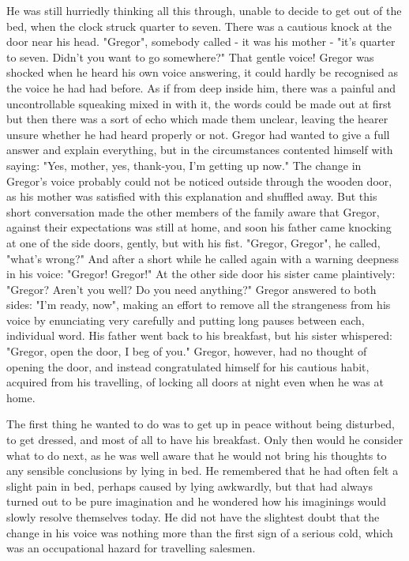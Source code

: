 \documentclass[12pt]{book}
\begin{document}
    He was still hurriedly thinking all this through, unable to decide to get out of the bed, when the clock struck quarter to seven. There was a cautious knock at the door near his head. "Gregor", somebody called - it was his mother - "it's quarter to seven. Didn't you want to go somewhere?" That gentle voice! Gregor was shocked when he heard his own voice answering, it could hardly be recognised as the voice he had had before. As if from deep inside him, there was a painful and uncontrollable squeaking mixed in with it, the words could be made out at first but then there was a sort of echo which made them unclear, leaving the hearer unsure whether he had heard properly or not. Gregor had wanted to give a full answer and explain everything, but in the circumstances contented himself with saying: "Yes, mother, yes, thank-you, I'm getting up now." The change in Gregor's voice probably could not be noticed outside through the wooden door, as his mother was satisfied with this explanation and shuffled away. But this short conversation made the other members of the family aware that Gregor, against their expectations was still at home, and soon his father came knocking at one of the side doors, gently, but with his fist. "Gregor, Gregor", he called, "what's wrong?" And after a short while he called again with a warning deepness in his voice: "Gregor! Gregor!" At the other side door his sister came plaintively: "Gregor? Aren't you well? Do you need anything?" Gregor answered to both sides: "I'm ready, now", making an effort to remove all the strangeness from his voice by enunciating very carefully and putting long pauses between each, individual word. His father went back to his breakfast, but his sister whispered: "Gregor, open the door, I beg of you." Gregor, however, had no thought of opening the door, and instead congratulated himself for his cautious habit, acquired from his travelling, of locking all doors at night even when he was at home.

    The first thing he wanted to do was to get up in peace without being disturbed, to get dressed, and most of all to have his breakfast. Only then would he consider what to do next, as he was well aware that he would not bring his thoughts to any sensible conclusions by lying in bed. He remembered that he had often felt a slight pain in bed, perhaps caused by lying awkwardly, but that had always turned out to be pure imagination and he wondered how his imaginings would slowly resolve themselves today. He did not have the slightest doubt that the change in his voice was nothing more than the first sign of a serious cold, which was an occupational hazard for travelling salesmen.
\end{document}

